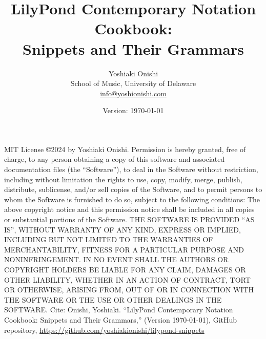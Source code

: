 \documentclass[11pt, oneside]{book}   	%
\title{LilyPond Contemporary Notation Cookbook: \\ Snippets and Their Grammars}
\author{Yoshiaki Onishi\\School of Music, University of Delaware \\ \href{mailto:info@yoshionishi.com}{info@yoshionishi.com}}
\date{Version: \today}
\begin{document}
\maketitle


MIT License
\hfill \break
\break
\copyright 2024 by Yoshiaki Onishi. 
\hfill \break
\break
Permission is hereby granted, free of charge, to any person obtaining a copy of this software and associated documentation files (the “Software”), to deal in the Software without restriction, including without limitation the rights to use, copy, modify, merge, publish, distribute, sublicense, and/or sell copies of the Software, and to permit persons to whom the Software is furnished to do so, subject to the following conditions:
\hfill \break
\break
The above copyright notice and this permission notice shall be included in all copies or substantial portions of the Software.
\hfill \break
\break
THE SOFTWARE IS PROVIDED “AS IS”, WITHOUT WARRANTY OF ANY KIND, EXPRESS OR IMPLIED, INCLUDING BUT NOT LIMITED TO THE WARRANTIES OF MERCHANTABILITY, FITNESS FOR A PARTICULAR PURPOSE AND NONINFRINGEMENT. IN NO EVENT SHALL THE AUTHORS OR COPYRIGHT HOLDERS BE LIABLE FOR ANY CLAIM, DAMAGES OR OTHER LIABILITY, WHETHER IN AN ACTION OF CONTRACT, TORT OR OTHERWISE, ARISING FROM, OUT OF OR IN CONNECTION WITH THE SOFTWARE OR THE USE OR OTHER DEALINGS IN THE SOFTWARE.
\hfill \break
\break
Cite: Onishi, Yoshiaki. “LilyPond Contemporary Notation Cookbook: Snippets and Their Grammars,” (Version \today), GitHub repository, \href{https://github.com/yoshiakionishi/lilypond-snippets}{https://github.com/yoshiakionishi/lilypond-snippets}\\ %


\frontmatter
\tableofcontents
\label{sec:toc}
\clearpage
\vfill \break






\mainmatter










\end{document}
